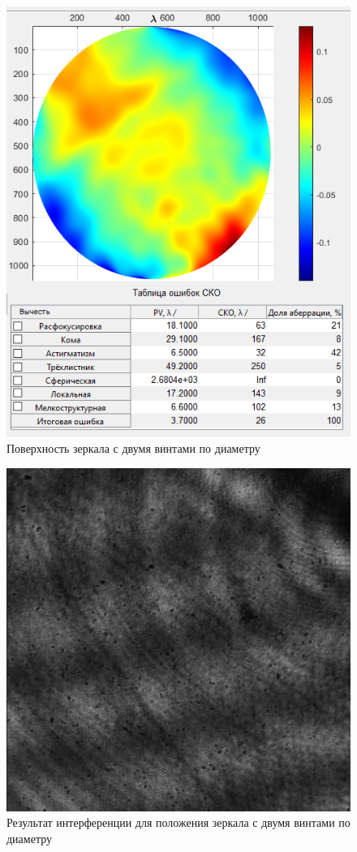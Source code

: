 \documentclass[a4paper, 12pt]{article}%
\begin{document}
\begin{enumerate}
		\begin{figure}[H]
			\centering
			\includegraphics[width=0.9\linewidth]{2ex.png}
			\caption{Поверхность зеркала с двумя винтами по диаметру}
		\end{figure}
		
		\begin{figure}[H]
			\centering
			\includegraphics[width=0.9\linewidth]{2ex-lines}
			\caption{Результат интерференции для положения зеркала с двумя винтами по диаметру}
		\end{figure}
		

\end{enumerate}
\end{document}
